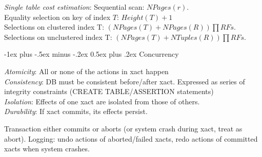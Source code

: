 \documentclass[10pt,landscape]{article}
\makeatletter
\renewcommand{\section}{\@startsection{section}{1}{0mm}%
                                {-1ex plus -.5ex minus -.2ex}%
                                {0.5ex plus .2ex}%
                                {\normalfont\large\bfseries}}
\makeatother
\begin{document}
\begin{multicols}{3}
\textit{Single table cost estimation}: Sequential scan: $NPages(r)$. \\
Equality selection on key of index $T$: $Height(T) + 1$ \\
Selections on clustered index T: $(NPages(T) + NPages(R)) \prod RFs$. \\
Selections on unclustered index T: $(NPages(T) + NTuples(R)) \prod RFs$.


\section{Concurrency}

\textit{Atomicity}: All or none of the actions in xact happen \\
\textit{Consistency}: DB must be consistent before/after xact. Expressed as series of integrity constraints (CREATE TABLE/ASSERTION statements) \\
\textit{Isolation}: Effects of one xact are isolated from those of others. \\
\textit{Durability}: If xact commits, its effects persist.

Transaction either commits or aborts (or system crash during xact, treat as abort). Logging: undo actions of aborted/failed xacts, redo actions of committed xacts when system crashes.


\end{multicols}
\end{document}
